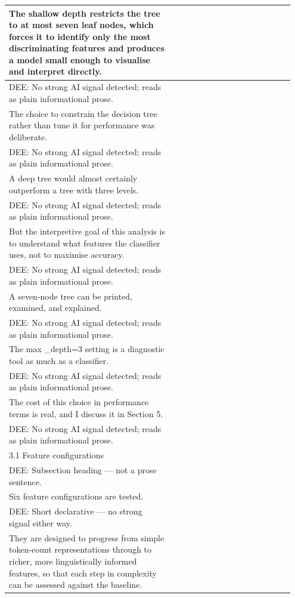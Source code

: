 \documentclass[11pt]{article}
\begin{document}
\begin{longtable}{|p{0.55\linewidth}|p{0.40\linewidth}|}
\hline
The shallow depth restricts the tree to at most seven leaf nodes, which forces it to identify only the most discriminating features and produces a model small enough to visualise and interpret directly. & \\[2pt]
\hline
DEE: No strong AI signal detected; reads as plain informational prose. & \\
\hline
The choice to constrain the decision tree rather than tune it for performance was deliberate. & \\[2pt]
\hline
DEE: No strong AI signal detected; reads as plain informational prose. & \\
\hline
A deep tree would almost certainly outperform a tree with three levels. & \\[2pt]
\hline
DEE: No strong AI signal detected; reads as plain informational prose. & \\
\hline
But the interpretive goal of this analysis is to understand what features the classifier uses, not to maximise accuracy. & \\[2pt]
\hline
DEE: No strong AI signal detected; reads as plain informational prose. & \\
\hline
A seven-node tree can be printed, examined, and explained. & \\[2pt]
\hline
DEE: No strong AI signal detected; reads as plain informational prose. & \\
\hline
The max \_depth=3 setting is a diagnostic tool as much as a classifier. & \\[2pt]
\hline
DEE: No strong AI signal detected; reads as plain informational prose. & \\
\hline
The cost of this choice in performance terms is real, and I discuss it in Section 5. & \\[2pt]
\hline
DEE: No strong AI signal detected; reads as plain informational prose. & \\
\hline
3.1 Feature configurations & \\[2pt]
\hline
DEE: Subsection heading --- not a prose sentence. & \\
\hline
Six feature configurations are tested. & \\[2pt]
\hline
DEE: Short declarative --- no strong signal either way. & \\
\hline
They are designed to progress from simple token-count representations through to richer, more linguistically informed features, so that each step in complexity can be assessed against the baseline. & \\[2pt]

\end{longtable}
\end{document}
